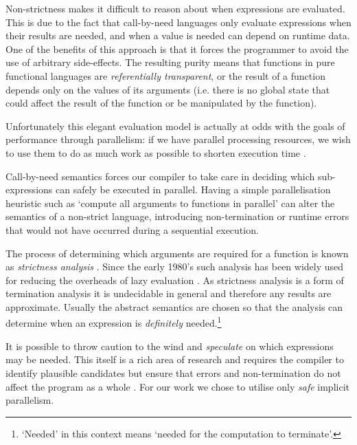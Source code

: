 Non-strictness makes it difficult to reason about when expressions are
evaluated. This is due to the fact that call-by-need languages only evaluate
expressions when their results are needed, and when a value is needed can
depend on runtime data. One of the benefits of this approach is that it forces
the programmer to avoid the use of arbitrary side-effects. The resulting purity
means that functions in pure functional languages are \emph{referentially
transparent}, or the result of a function depends only on the values of its
arguments (i.e.  there is no global state that could affect the result of the
function or be manipulated by the function).

Unfortunately this elegant evaluation model is actually at odds with the goals
of performance through parallelism: if we have parallel processing resources,
we wish to use them to do as much work as possible to shorten execution time
\citep{tremblay1995impact}.

Call-by-need semantics forces our compiler to take care in deciding which
sub-expressions can safely be executed in parallel. Having a simple
parallelisation heuristic such as `compute all arguments to functions in
parallel' can alter the semantics of a non-strict language, introducing
non-termination or runtime errors that would not have occurred during a
sequential execution.

The process of determining which arguments are required for a function is known
as \emph{strictness analysis} \citep{mycroft1980theory}. Since the early 1980's
such analysis has been widely used for reducing the overheads of lazy
evaluation \citep{SergeyDemand}. As strictness analysis is a form of
termination analysis it is undecidable in general and therefore any results are
approximate. Usually the abstract semantics are chosen so that the analysis can
determine when an expression is \emph{definitely} needed.\footnote{`Needed' in
this context means `needed for the computation to terminate'.}

It is possible to throw caution to the wind and \emph{speculate} on which
expressions may be needed. This itself is a rich area of research and requires
the compiler to identify plausible candidates but ensure that errors and
non-termination do not affect the program as a whole . For our work we chose to utilise only \emph{safe}
implicit parallelism.


